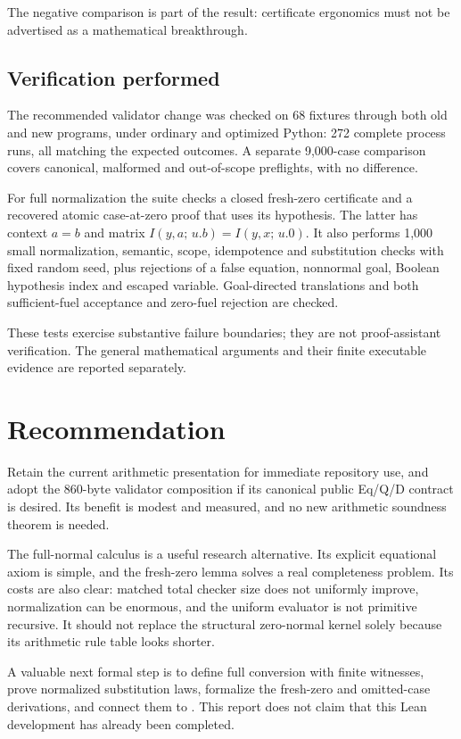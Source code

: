 \documentclass[11pt]{article}
\theoremstyle{definition}
\newcommand{\I}[3]{I(#1,#2;\,#3)}
\newcommand{\code}[1]{\texttt{\detokenize{#1}}}
\begin{document}
The negative comparison is part of the result: certificate ergonomics
must not be advertised as a mathematical breakthrough.

\subsection{Verification performed}

The recommended validator change was checked on 68 fixtures through
both old and new programs, under ordinary and optimized Python:
272 complete process runs, all matching the expected outcomes.
A separate 9,000-case comparison covers canonical, malformed and
out-of-scope preflights, with no difference.

For full normalization the suite checks a closed fresh-zero certificate
and a recovered atomic case-at-zero proof that uses its hypothesis.
The latter has context $a=b$ and matrix
$\I{y}{a}{u.b}=\I{y}{x}{u.0}$.
It also performs 1,000 small normalization, semantic, scope,
idempotence and substitution checks with fixed random seed, plus
rejections of a false equation, nonnormal goal, Boolean hypothesis
index and escaped variable. Goal-directed translations and both
sufficient-fuel acceptance and zero-fuel rejection are checked.

These tests exercise substantive failure boundaries; they are not
proof-assistant verification. The general mathematical arguments and
their finite executable evidence are reported separately.

\section{Recommendation}

Retain the current arithmetic presentation for immediate repository
use, and adopt the 860-byte validator composition if its canonical
public Eq/Q/D contract is desired. Its benefit is modest and measured,
and no new arithmetic soundness theorem is needed.

The full-normal calculus is a useful research alternative.
Its explicit equational axiom is simple, and the fresh-zero lemma
solves a real completeness problem. Its costs are also clear:
matched total checker size does not uniformly improve, normalization
can be enormous, and the uniform evaluator is not primitive
recursive. It should not replace the structural zero-normal kernel
solely because its arithmetic rule table looks shorter.

A valuable next formal step is to define full conversion with finite
witnesses, prove normalized substitution laws, formalize the fresh-zero
and omitted-case derivations, and connect them to
\code{native_iff_pra}. This report does not claim that this Lean
development has already been completed.
\end{document}
